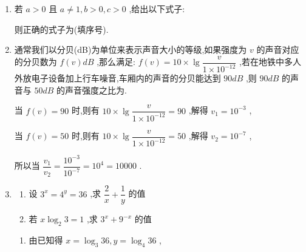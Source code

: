 \begin{enumerate}
\begin{jieda}
        又 $x > 0,y > 0,x - {2y} > 0$ ,所以舍去 $x = y$ ,故 $x = {4y}$ ,则 $\dfrac{x}{y} = 4$ .
    \end{jieda}
    \item 若 $a > 0$ 且 $a \neq  1,b > 0,c > 0$ ,给出以下式子:
    则正确的式子为(填序号). 
    \item 通常我们以分贝(dB)为单位来表示声音大小的等级,如果强度为 $v$ 的声音对应的分贝数为 $f\left( v\right) {{dB}}$ ,那么满足: $f\left( v\right)  = {10} \times  \lg \dfrac{v}{1 \times  {10}^{-{12}}}$ ,若在地铁中多人外放电子设备加上行车噪音,车厢内的声音的分贝能达到 ${90}{{dB}}$ ,则 ${90}{{dB}}$ 的声音与 ${50}{{dB}}$ 的声音强度之比为.
    \begin{jieda}
        当 $f\left( v\right)  = {90}$ 时,则有 ${10} \times  \lg \dfrac{v}{1 \times  {10}^{-{12}}} = {90}$ ,解得 ${v}_{1} = {10}^{-3}$ ,
        
        当 $f\left( v\right)  = {50}$ 时,则有 ${10} \times  \lg \dfrac{v}{1 \times  {10}^{-{12}}} = {50}$ ,解得 ${v}_{2} = {10}^{-7}$ ,
        
        所以当 $\dfrac{{v}_{1}}{{v}_{2}} = \dfrac{{10}^{-3}}{{10}^{-7}} = {10}^{4} = {10000}$ .
    \end{jieda}
    \item \begin{enumerate}
        \item 设 ${3}^{x} = {4}^{y} = {36}$ ,求 $\dfrac{2}{x} + \dfrac{1}{y}$ 的值
        \item 若 $x{\log }_{2}3 = 1$ ,求 ${3}^{x} + {9}^{-x}$ 的值
    \end{enumerate}
    \begin{jieda}
        \begin{enumerate}
            \item 由已知得 $x = {\log }_{3}{36},y = {\log }_{4}{36}$ ,


\end{enumerate}
\end{jieda}
\end{enumerate}
